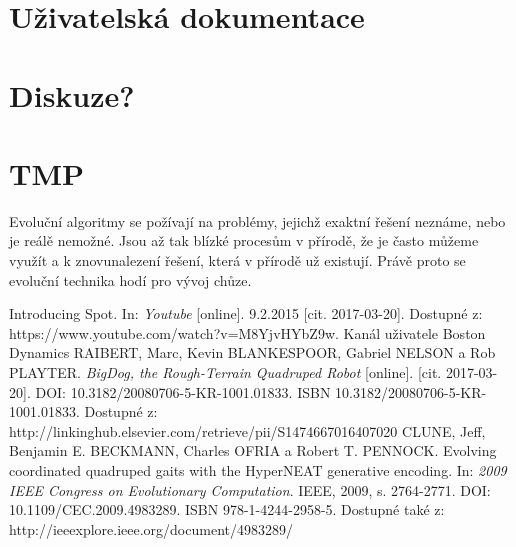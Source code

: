 \documentclass[a4]{article}
\begin{document}
\section{Uživatelská dokumentace} 
\section{Diskuze?} 
\section{TMP}
Evoluční algoritmy se požívají na problémy, jejichž exaktní řešení neznáme, nebo je reálě nemožné. Jsou až tak blízké procesům v přírodě, že je často můžeme využít a k znovunalezení řešení, která v přírodě už existují. Právě proto se evoluční technika hodí pro vývoj chůze.
\begin{thebibliography}{3}
Introducing Spot. In: \textit{Youtube} [online]. 9.2.2015 [cit. 2017-03-20]. Dostupné z: https://www.youtube.com/watch?v=M8YjvHYbZ9w. Kanál uživatele Boston Dynamics
RAIBERT, Marc, Kevin BLANKESPOOR, Gabriel NELSON a Rob PLAYTER. \textit{BigDog, the Rough-Terrain Quadruped Robot} [online]. [cit. 2017-03-20]. DOI: 10.3182/20080706-5-KR-1001.01833. ISBN 10.3182/20080706-5-KR-1001.01833. Dostupné z: http://linkinghub.elsevier.com/retrieve/pii/S1474667016407020
CLUNE, Jeff, Benjamin E. BECKMANN, Charles OFRIA a Robert T. PENNOCK. Evolving coordinated quadruped gaits with the HyperNEAT generative encoding. In: \textit{2009 IEEE Congress on Evolutionary Computation}. IEEE, 2009, s. 2764-2771. DOI: 10.1109/CEC.2009.4983289. ISBN 978-1-4244-2958-5. Dostupné také z: http://ieeexplore.ieee.org/document/4983289/
\end{thebibliography}
\end{document}
